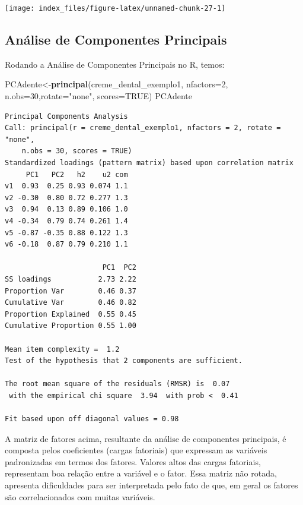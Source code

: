 \documentclass[12pt,brazil,oneside]{book}
\newenvironment{Shaded}{\begin{snugshade}}{\end{snugshade}}
\newcommand{\DataTypeTok}[1]{\textcolor[rgb]{0.13,0.29,0.53}{#1}}
\newcommand{\DecValTok}[1]{\textcolor[rgb]{0.00,0.00,0.81}{#1}}
\newcommand{\KeywordTok}[1]{\textcolor[rgb]{0.13,0.29,0.53}{\textbf{#1}}}
\newcommand{\NormalTok}[1]{#1}
\newcommand{\OtherTok}[1]{\textcolor[rgb]{0.56,0.35,0.01}{#1}}
\newcommand{\StringTok}[1]{\textcolor[rgb]{0.31,0.60,0.02}{#1}}
\begin{document}
\begin{center}\texttt{[image: index\_files/figure-latex/unnamed-chunk-27-1]} \end{center}

\hypertarget{analise-de-componentes-principais}{%
\subsection{Análise de Componentes Principais}\label{analise-de-componentes-principais}}

Rodando a Análise de Componentes Principais no R, temos:

\begin{Shaded}
\begin{Highlighting}[]
\NormalTok{PCAdente<-}\KeywordTok{principal}\NormalTok{(creme_dental_exemplo1, }\DataTypeTok{nfactors=}\DecValTok{2}\NormalTok{,}
                \DataTypeTok{n.obs=}\DecValTok{30}\NormalTok{,}\DataTypeTok{rotate=}\StringTok{"none"}\NormalTok{, }\DataTypeTok{scores=}\OtherTok{TRUE}\NormalTok{)}
\NormalTok{PCAdente}
\end{Highlighting}
\end{Shaded}

\begin{verbatim}
Principal Components Analysis
Call: principal(r = creme_dental_exemplo1, nfactors = 2, rotate = "none", 
    n.obs = 30, scores = TRUE)
Standardized loadings (pattern matrix) based upon correlation matrix
     PC1   PC2   h2    u2 com
v1  0.93  0.25 0.93 0.074 1.1
v2 -0.30  0.80 0.72 0.277 1.3
v3  0.94  0.13 0.89 0.106 1.0
v4 -0.34  0.79 0.74 0.261 1.4
v5 -0.87 -0.35 0.88 0.122 1.3
v6 -0.18  0.87 0.79 0.210 1.1

                       PC1  PC2
SS loadings           2.73 2.22
Proportion Var        0.46 0.37
Cumulative Var        0.46 0.82
Proportion Explained  0.55 0.45
Cumulative Proportion 0.55 1.00

Mean item complexity =  1.2
Test of the hypothesis that 2 components are sufficient.

The root mean square of the residuals (RMSR) is  0.07 
 with the empirical chi square  3.94  with prob <  0.41 

Fit based upon off diagonal values = 0.98
\end{verbatim}

A matriz de fatores acima, resultante da análise de componentes principais, é composta pelos coeficientes (cargas fatoriais) que expressam as variáveis padronizadas em termos dos fatores.
Valores altos das cargas fatoriais, representam boa relação entre a variável e o fator. Essa matriz não rotada, apresenta dificuldades para ser interpretada pelo fato de que, em geral os fatores são correlacionados com muitas variáveis.
\end{document}
